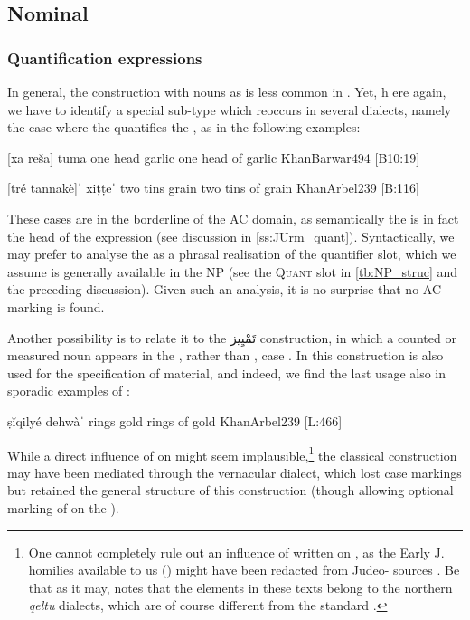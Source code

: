 \subsection{Nominal \secns} \label{ss:juxt_nom}


\subsubsection{Quantification expressions} \label{ss:juxt_nom_quant}
\largerpage
In general, the  construction with nouns as \secns is less common in . Yet, h	ere again, we have to identify a special sub-type which reoccurs in several dialects, namely the case where the \prim quantifies the \secn, as in the following examples:

{[xa\cb{} reša] tuma}
{one\cb{} head garlic}
{one head of garlic}
{KhanBarwar}{494 {[B10:19]}}\antipar\antipar

\newpage 

{[tré tannakè]ˈ xiṭṭeˈ}
{two tins grain}
{two tins of grain}
{KhanArbel}{239 {[B:116]}}

These cases are in the borderline of the AC domain, as semantically the \secn is in fact the head of the expression (see discussion in \ref{ss:JUrm_quant}). Syntactically, we may prefer to analyse the \prim as a phrasal realisation of the quantifier slot, which we assume is generally available in the  NP (see the \textsc{Quant} slot in  \vref{tb:NP_struc} and the preceding discussion). Given such an analysis, it is no surprise that no AC marking  is found. 

Another possibility is to relate it  to the \CArab \textarabic{تَمْيِيز}  construction, in which a counted or measured noun appears in the \acc*, rather than \gen*, case \citep[157]{SchulzArabic}. In \CArab this construction is also used for the specification of material, and indeed, we find the last usage also in sporadic examples of :


{ṣĭqilyé dehwàˈ}
{rings gold}
{rings of gold}
{KhanArbel}{239 {[L:466]}}

While a direct influence of \CArab on  might seem implausible,\footnote{One cannot  completely rule out an influence of written  on , as the Early J.  homilies available to us (\Nrt) might have been redacted from Judeo- sources \citep[201]{SabarArabic}. Be that as it may, \citet[202]{SabarArabic} notes that the  elements in these texts belong to the northern \Iraq \textit{qeltu} dialects, which are of course different from the standard \CArab.}
 the classical construction may  have been mediated through the vernacular \Iraq  dialect, which lost case markings but retained the general structure of this construction (though allowing optional marking of \cst* on the \prim).

